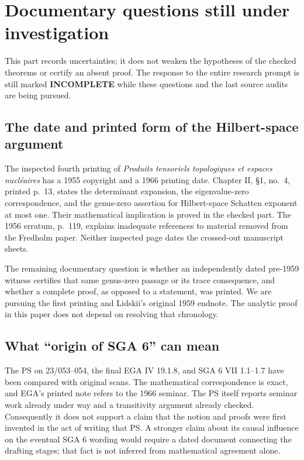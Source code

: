 \section{Documentary questions still under investigation}

This part records uncertainties; it does not weaken the hypotheses of
the checked theorems or certify an absent proof. The response to the
entire research prompt is still marked \textbf{INCOMPLETE} while these
questions and the last source audits are being pursued.

\subsection{The date and printed form of the Hilbert-space argument}

The inspected fourth printing of \emph{Produits tensoriels topologiques
et espaces nucl\'eaires} has a 1955 copyright and a 1966 printing date.
Chapter II, \S1, no.~4, printed p.~13, states the determinant expansion,
the eigenvalue-zero correspondence, and the genus-zero assertion for
Hilbert-space Schatten exponent at most one. Their mathematical
implication is proved in the checked part. The 1956 erratum, p.~119,
explains inadequate references to material removed from the Fredholm
paper. Neither inspected page dates the crossed-out manuscript sheets.

The remaining documentary question is whether an independently dated
pre-1959 witness certifies that same genus-zero passage or its trace
consequence, and whether a complete proof, as opposed to a statement,
was printed. We are pursuing the first printing and Lidskii's original
1959 endnote. The analytic proof in this paper does not depend on
resolving that chronology.

\subsection{What ``origin of SGA 6'' can mean}

The PS on 23/053--054, the final EGA IV 19.1.8, and SGA 6 VII
1.1--1.7 have been compared with original scans. The mathematical
correspondence is exact, and EGA's printed note refers to the 1966
seminar. The PS itself reports seminar work already under way and a
transitivity argument already checked. Consequently it does not
support a claim that the notion and proofs were first invented in
the act of writing that PS. A stronger claim about its causal
influence on the eventual SGA 6 wording would require a dated
document connecting the drafting stages; that fact is not inferred
from mathematical agreement alone.

